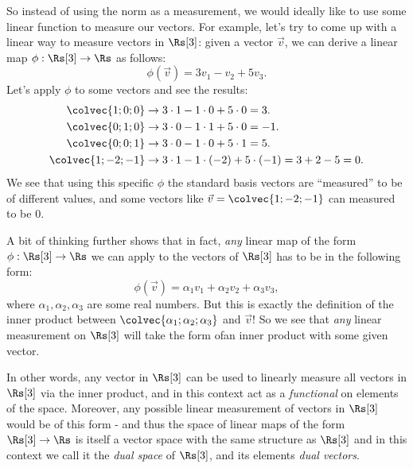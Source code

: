 So instead of using the norm as a measurement, we would ideally like to use some linear function to measure our vectors. For example, let's try to come up with a linear way to measure vectors in $\Rs[3]$: given a vector $\vec{v}$, we can derive a linear map $\phi:\Rs[3]\to\Rs$ as follows:
\begin{equation}
    \phi\left(\vec{v}\right) = 3v_{1} - v_{2} + 5v_{3}.
    \label{eq:linear_map_R3_example}
\end{equation}
Let's apply $\phi$ to some vectors and see the results:
\begin{align*}
    \colvec{1;0;0} &\to 3\cdot1 -1\cdot0 + 5\cdot0 = 3.\\
    \colvec{0;1;0} &\to 3\cdot0 -1\cdot1 + 5\cdot0 = -1.\\
    \colvec{0;0;1} &\to 3\cdot0 -1\cdot0 + 5\cdot1 = 5.\\
    \colvec{1;-2;-1} &\to 3\cdot1 -1\cdot(-2) + 5\cdot(-1) = 3+2-5=0.\\
\end{align*}
We see that using this specific $\phi$ the standard basis vectors are \enquote{measured} to be of different values, and some vectors like $\vec{v}=\colvec{1;-2;-1}$ can measured to be $0$.

A bit of thinking further shows that in fact, \textit{any} linear map of the form $\phi:\Rs[3]\to\Rs$ we can apply to the vectors of $\Rs[3]$ has to be in the following form:
\begin{equation}
    \phi\left(\vec{v}\right) = \alpha_{1}v_{1} + \alpha_{2}v_{2} + \alpha_{3}v_{3},
    \label{eq:general_linear_measure_R3}
\end{equation}
where $\alpha_{1},\alpha_{2},\alpha_{3}$ are some real numbers. But this is exactly the definition of the inner product between $\colvec{\alpha_{1};\alpha_{2};\alpha_{3}}$ and $\vec{v}$! So we see that \textit{any} linear measurement on $\Rs[3]$ will take the form ofan inner product with some given vector.

In other words, any vector in $\Rs[3]$ can be used to linearly measure all vectors in $\Rs[3]$ via the inner product, and in this context act as a \textit{functional} on elements of the space. Moreover, any possible linear measurement of vectors in $\Rs[3]$ would be of this form - and thus the space of linear maps of the form $\Rs[3]\to\Rs$ is itself a vector space with the same structure as $\Rs[3]$ and in this context we call it the \textit{dual space} of $\Rs[3]$, and its elements \textit{dual vectors}.

